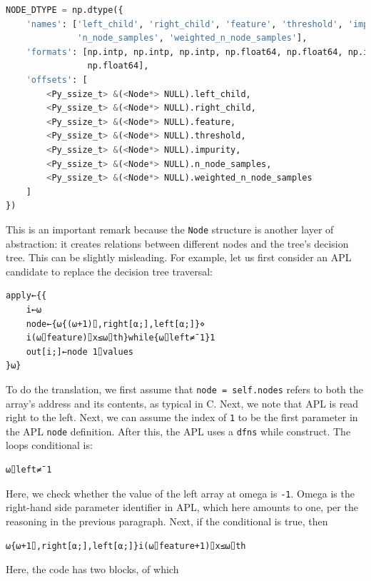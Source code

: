 \documentclass{IEEEtran}
\begin{document}
\begin{lstlisting}[language=Python]
NODE_DTYPE = np.dtype({
    'names': ['left_child', 'right_child', 'feature', 'threshold', 'impurity',
              'n_node_samples', 'weighted_n_node_samples'],
    'formats': [np.intp, np.intp, np.intp, np.float64, np.float64, np.intp,
                np.float64],
    'offsets': [
        <Py_ssize_t> &(<Node*> NULL).left_child,
        <Py_ssize_t> &(<Node*> NULL).right_child,
        <Py_ssize_t> &(<Node*> NULL).feature,
        <Py_ssize_t> &(<Node*> NULL).threshold,
        <Py_ssize_t> &(<Node*> NULL).impurity,
        <Py_ssize_t> &(<Node*> NULL).n_node_samples,
        <Py_ssize_t> &(<Node*> NULL).weighted_n_node_samples
    ]
})
\end{lstlisting}

This is an important remark because the \verb|Node| structure is another layer of abstraction: it creates relations between different nodes and the tree's decision tree. This can be slightly misleading. For example, let us first consider an APL candidate to replace the decision tree traversal:

{\aplfont\begin{verbatim}
apply←{{
    i←⍵
    node←{⍵{(⍵+1)⌷,right[⍺;],left[⍺;]}⋄
    i(⍵⌷feature)⌷x≤⍵⌷th}while{⍵⌷left≠¯1}1
    out[i;]←node 1⌷values
}⍵}
\end{verbatim}}

To do the translation, we first assume that \verb|node = self.nodes| refers to both the array's address and its contents, as typical in C. Next, we note that APL is read right to the left. Next, we can assume the index of \verb|1| to be the first parameter in the APL \verb|node| definition. After this, the APL uses a \verb|dfns| while construct. The loops conditional is:

{\aplfont\begin{verbatim}
⍵⌷left≠¯1
\end{verbatim}}

Here, we check whether the value of the left array at omega is \verb|-1|. Omega is the right-hand side parameter identifier in APL, which here amounts to one, per the reasoning in the previous paragraph. Next, if the conditional is true, then

{\aplfont\begin{verbatim}
⍵{⍵+1⌷,right[⍺;],left[⍺;]}i(⍵⌷feature+1)⌷x≤⍵⌷th
\end{verbatim}}

Here, the code has two blocks, of which
\end{document}
